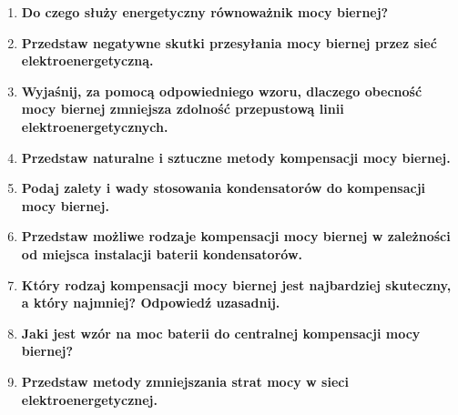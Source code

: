 \documentclass[12pt]{article}
\newcommand{\pytanie}[1]{\item \textbf{#1}}
\begin{document}
\begin{enumerate}
	    \pytanie{Do czego służy energetyczny równoważnik mocy biernej?}
	
	    \pytanie{Przedstaw negatywne skutki przesyłania mocy biernej przez sieć 
	    elektroenergetyczną.}
	
	    \pytanie{Wyjaśnij, za pomocą odpowiedniego wzoru, dlaczego obecność mocy biernej 
	    zmniejsza zdolność przepustową linii elektroenergetycznych.}
	
	    \pytanie{Przedstaw naturalne i sztuczne metody kompensacji mocy biernej.}
	
	    \pytanie{Podaj zalety i wady stosowania kondensatorów do kompensacji mocy biernej.}
	
	    \pytanie{Przedstaw możliwe rodzaje kompensacji mocy biernej w zależności od miejsca 
	    instalacji baterii kondensatorów.}
	
	    \pytanie{Który rodzaj kompensacji mocy biernej jest najbardziej skuteczny, a który 
	    najmniej? Odpowiedź uzasadnij.}
	
	    \pytanie{Jaki jest wzór na moc baterii do centralnej kompensacji mocy biernej?}
	
	    \pytanie{Przedstaw metody zmniejszania strat mocy w sieci elektroenergetycznej.}
	
	\end{enumerate}
\end{document}
